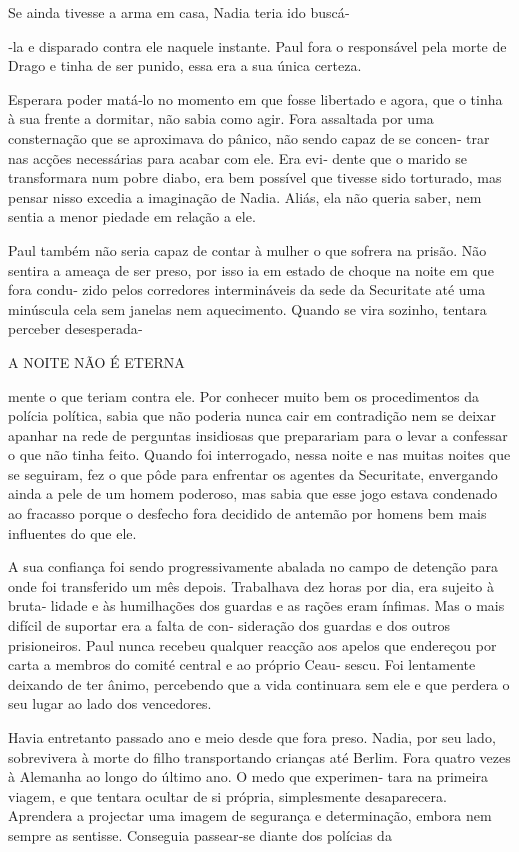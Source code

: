 Se ainda tivesse a arma em casa, Nadia teria ido buscá‑

‑la e disparado contra ele naquele instante. Paul fora o responsável
pela morte de Drago e tinha de ser punido, essa era a sua única certeza.

Esperara poder matá‑lo no momento em que fosse libertado e agora, que o
tinha à sua frente a dormitar, não sabia como agir. Fora assaltada por
uma consternação que se aproximava do pânico, não sendo capaz de se
concen‑ trar nas acções necessárias para acabar com ele. Era evi‑ dente
que o marido se transformara num pobre diabo, era bem possível que
tivesse sido torturado, mas pensar nisso excedia a imaginação de Nadia.
Aliás, ela não queria saber, nem sentia a menor piedade em relação a
ele.

Paul também não seria capaz de contar à mulher o que sofrera na prisão.
Não sentira a ameaça de ser preso, por isso ia em estado de choque na
noite em que fora condu‑ zido pelos corredores intermináveis da sede da
Securitate até uma minúscula cela sem janelas nem aquecimento. Quando se
vira sozinho, tentara perceber desesperada‑

A NOITE NÃO É ETERNA

mente o que teriam contra ele. Por conhecer muito bem os procedimentos
da polícia política, sabia que não poderia nunca cair em contradição nem
se deixar apanhar na rede de perguntas insidiosas que preparariam para o
levar a confessar o que não tinha feito. Quando foi interrogado, nessa
noite e nas muitas noites que se seguiram, fez o que pôde para enfrentar
os agentes da Securitate, envergando ainda a pele de um homem poderoso,
mas sabia que esse jogo estava condenado ao fracasso porque o desfecho
fora decidido de antemão por homens bem mais influentes do que ele.

A sua confiança foi sendo progressivamente abalada no campo de detenção
para onde foi transferido um mês depois. Trabalhava dez horas por dia,
era sujeito à bruta‑ lidade e às humilhações dos guardas e as rações
eram ínfimas. Mas o mais difícil de suportar era a falta de con‑
sideração dos guardas e dos outros prisioneiros. Paul nunca recebeu
qualquer reacção aos apelos que endereçou por carta a membros do comité
central e ao próprio Ceau‑ sescu. Foi lentamente deixando de ter ânimo,
percebendo que a vida continuara sem ele e que perdera o seu lugar ao
lado dos vencedores.

Havia entretanto passado ano e meio desde que fora preso. Nadia, por seu
lado, sobrevivera à morte do filho transportando crianças até Berlim.
Fora quatro vezes à Alemanha ao longo do último ano. O medo que
experimen‑ tara na primeira viagem, e que tentara ocultar de si própria,
simplesmente desaparecera. Aprendera a projectar uma imagem de segurança
e determinação, embora nem sempre as sentisse. Conseguia passear‑se
diante dos polícias da

